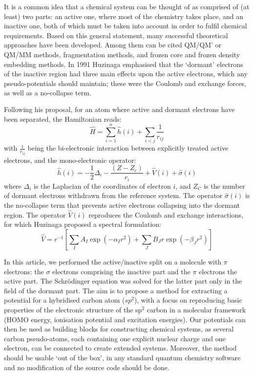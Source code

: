 \documentclass[12pt]{article}
\begin{document}
It is a common idea that a chemical system can be thought of as comprised of (at least) 
two parts:
an active one, where most of the chemistry takes place, and an inactive one, both of which must be taken into account in order to fulfil chemical requirements.
Based on this general statement, many successful theoretical approaches have been developed. Among them can be cited QM/QM' or QM/MM methods,\cite{chung_oniom_2015} fragmentation methods,
\cite{gordon_effective_2001,
steinmann_effective_2012,collins_energy-based_2015} and frozen core and frozen density embedding methods.\cite{assfeld_quantum_1996,jacob_calculation_2006,artemyev_photoelectron_2015,wesolowski_frozen-density_2015}
In 1991 Huzinaga emphasised that the `dormant' electrons of the inactive region had three main effects upon the active electrons, which any pseudo-potentials should maintain; these were the Coulomb and exchange forces, as well as a no-collapse term.\cite{huzinaga_effective_1991}

Following his proposal, for an atom where active and dormant electrons have been separated, the Hamiltonian reads:
\begin{equation}
\label{eq:atomicHamiltonian}
\hat{H} = \sum_{i=1}^n \hat{h}(i) +\sum_{i<j}\frac{1}{r_{ij}}
\end{equation}
with $\frac{1}{r_{ij}}$ being the bi-electronic interaction
between explicitly treated active electrons, and
the mono-electronic operator:
\begin{equation}
\label{eq:monoElectronicOperator}
\hat{h}(i) = -\frac{1}{2}\Delta_i - \frac{(Z-Z_c)}{r_i}+\hat{V}(i) + \hat{\sigma}(i)
\end{equation}
where $\Delta_i$ is the Laplacian of the coordinates of electron $i$, and 
$Z_C$ is the number of dormant electrons withdrawn from the reference system.
The operator $\hat{\sigma}(i)$ is the no-collapse term that prevents active electrons
collapsing into the dormant region. The operator $\hat{V}(i)$ reproduces the 
Coulomb and exchange interactions, for which Huzinaga proposed a spectral formulation:
\begin{equation}
\label{eq:HuzinagaMPVersion1Potential}
\hat{V} = r^{-1}\left[\sum_IA_I\exp(-\alpha_I r^2)+\sum_JB_Jr\exp(-\beta_J r^2)\right]
\end{equation}

In this article, we performed the active/inactive split on a molecule with $\pi$ electrons: the $\sigma$ electrons comprising the inactive part and the $\pi$ electrons the active part.
The Schr\"odinger equation was solved for the latter part only in the field of the dormant part.
The aim is to propose a method for extracting a potential for a hybridised carbon atom 
($sp^2$), with a focus on reproducing basic properties of the electronic structure of the sp$^2$ carbon in a molecular framework 
(HOMO energy, ionisation potential and excitation energies).
Our potentials can then be used as 
building blocks for constructing chemical systems, as several carbon pseudo-atoms,
each containing one explicit nuclear charge and one electron, can be connected to create extended
systems.
Moreover, the method should be usable `out of the box', in any standard quantum chemistry software
and no modification of the source code should be done.
\end{document}

